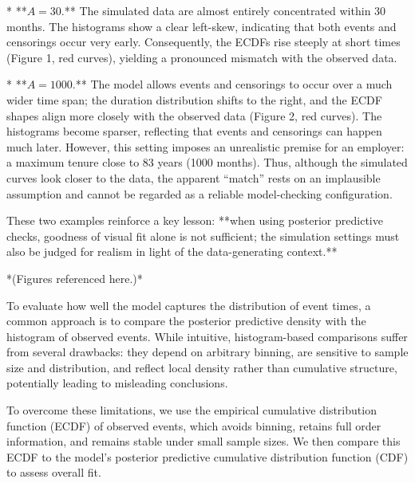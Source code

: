 * **$A=30$.** The simulated data are almost entirely concentrated within 30 months. The histograms show a clear left-skew, indicating that both events and censorings occur very early. Consequently, the ECDFs rise steeply at short times (Figure 1, red curves), yielding a pronounced mismatch with the observed data.

* **$A=1000$.** The model allows events and censorings to occur over a much wider time span; the duration distribution shifts to the right, and the ECDF shapes align more closely with the observed data (Figure 2, red curves). The histograms become sparser, reflecting that events and censorings can happen much later. However, this setting imposes an unrealistic premise for an employer: a maximum tenure close to 83 years (1000 months). Thus, although the simulated curves look closer to the data, the apparent “match” rests on an implausible assumption and cannot be regarded as a reliable model-checking configuration.

These two examples reinforce a key lesson: **when using posterior predictive checks, goodness of visual fit alone is not sufficient; the simulation settings must also be judged for realism in light of the data-generating context.**

*(Figures referenced here.)*





To evaluate how well the model captures the distribution of event times, a common approach is to compare the posterior predictive density with the histogram of observed events. While intuitive, histogram-based comparisons suffer from several drawbacks: they depend on arbitrary binning, are sensitive to sample size and distribution, and reflect local density rather than cumulative structure, potentially leading to misleading conclusions.

To overcome these limitations, we use the empirical cumulative distribution function (ECDF) of observed events, which avoids binning, retains full order information, and remains stable under small sample sizes. We then compare this ECDF to the model’s posterior predictive cumulative distribution function (CDF) to assess overall fit.

